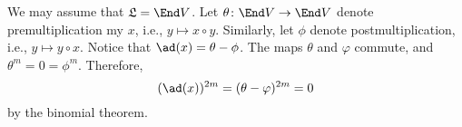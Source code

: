 We may assume that $\mathfrak{L} = \End V$. Let
$\theta\colon \End V\to \End V$ denote premultiplication my  $x$,
i.e., $y\mapsto x \circ y$. Similarly, let $\phi$ denote
postmultiplication, i.e., $y\mapsto y \circ x$. Notice that
$\ad(x) = \theta - \phi$. The maps $\theta$ and $\varphi$ commute, and
$\theta^m = 0 = \phi^m$. Therefore,
\[ (\ad(x))^{2m} = (\theta - \varphi)^{2m} = 0 \]
by the binomial theorem.
